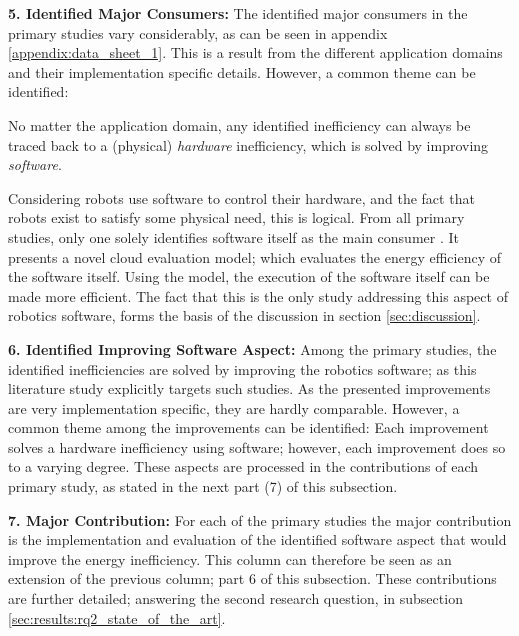 \noindent\textbf{5. Identified Major Consumers:}
The identified major consumers in the primary studies vary considerably, as can be seen in appendix \ref{appendix:data_sheet_1}.
This is a result from the different application domains and their implementation specific details.
However, a common theme can be identified:

\vspace{2mm}

No matter the application domain, any identified inefficiency can always be traced back to a (physical) \textit{hardware} inefficiency, 
which is solved by improving \textit{software}.

\vspace{2mm}

Considering robots use software to control their hardware, and the fact that robots exist to satisfy some physical need, this is logical.
From all primary studies, only one solely identifies software itself as the main consumer \cite{hou2017novel_cloud_evaluation_model}.
It presents a novel cloud evaluation model; which evaluates the energy efficiency of the software itself.
Using the model, the execution of the software itself can be made more efficient. 
The fact that this is the only study addressing this aspect of robotics software, forms the basis of the discussion in section \ref{sec:discussion}.

\vspace{5mm}

\noindent\textbf{6. Identified Improving Software Aspect:}
Among the primary studies, the identified inefficiencies are solved by improving the robotics software;
as this literature study explicitly targets such studies.
As the presented improvements are very implementation specific, they are hardly comparable.
However, a common theme among the improvements can be identified:
Each improvement solves a hardware inefficiency using software; however, each improvement does so to a varying degree. 
These aspects are processed in the contributions of each primary study, 
as stated in the next part (7) of this subsection.

\newpage

\noindent\textbf{7. Major Contribution:}
For each of the primary studies the major contribution is the implementation and evaluation of the identified software aspect that would
improve the energy inefficiency. 
This column can therefore be seen as an extension of the previous column; part 6 of this subsection.
These contributions are further detailed; answering the second research question, in subsection \ref{sec:results:rq2_state_of_the_art}.

